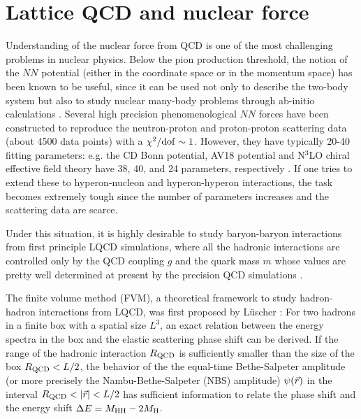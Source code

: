 \section{Lattice QCD and nuclear force}

Understanding of  the nuclear force from QCD
 is one of the most challenging problems in nuclear physics.
 Below the pion production threshold,
  the notion of the $NN$ potential (either in the coordinate space or in
  the  momentum space) has been known to be  useful, since it can be 
   used not only to describe the two-body system but also to 
   study  nuclear many-body problems through ab-initio calculations \cite{this_book}.
  Several high precision phenomenological $NN$ forces 
  have been constructed to reproduce
  the   neutron-proton and proton-proton scattering data (about 4500 data points)
   with a $\chi^2/{\rm dof} \sim 1$. However, 
     they have typically 20-40 fitting parameters:
   e.g. the CD Bonn potential, AV18 potential and N$^3$LO chiral effective field 
   theory have 38, 40, and 24 parameters, respectively \cite{Machleidt:2007ms}.
  If one tries to extend these to hyperon-nucleon and hyperon-hyperon interactions,
  the task becomes extremely tough since  the number of parameters 
   increases and the scattering data are scarce.
 
    Under this situation, it is highly desirable to
  study  baryon-baryon interactions from  first principle
  LQCD simulations, where  all the hadronic interactions are
   controlled only by the QCD coupling $g$  and 
    the quark mass $m$  whose values are
    pretty well determined at present by the precision QCD simulations \cite{Aoki:2013ldr}.
 
 The finite volume method (FVM), a
  theoretical framework to study hadron-hadron interactions
  from LQCD, was first  proposed 
  by L\"{u}scher \cite{luescher}: For two hadrons in a finite
  box with a spatial size $L^3$,  
  an exact relation between  the energy spectra in the box
  and the elastic scattering phase shift can be 
   derived.  If the range of the hadronic interaction $R_{\rm QCD}$  is sufficiently
  smaller than the size of the box $R_{\rm QCD}<L/2$, the behavior of the 
  the equal-time Bethe-Salpeter amplitude (or more precisely 
  the Nambu-Bethe-Salpeter (NBS) amplitude)
     $\psi (\vec{r})$ in the interval $R_{\rm QCD} < | \vec{r} | < L/2 $
    has sufficient information to relate the phase shift and the 
  energy shift $\Delta E =M_{\rm HH}-2M_{\rm H}$.
  
